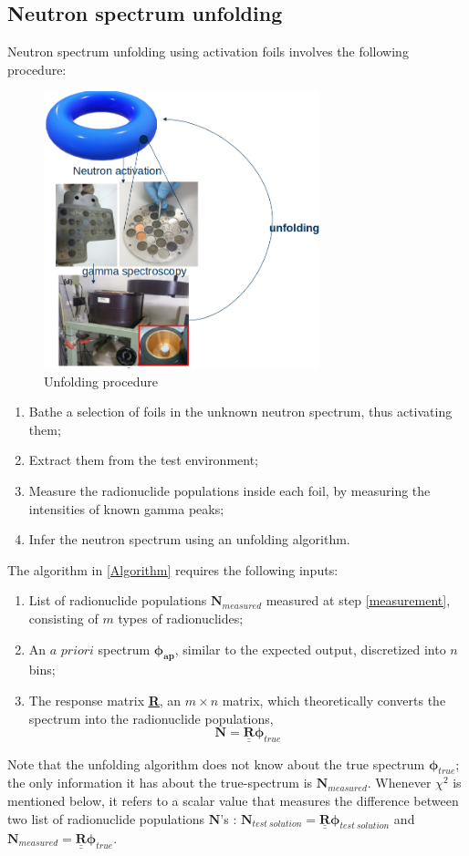 \documentclass[a4paper, 12pt]{article}
\newcommand{\matr}[1]{\underline{\underline{\textbf{#1}}}}
\newcommand{\ve}[1]{\boldsymbol{#1}}
\newcommand{\apriori}{\textit{a priori}}
\begin{document}
\begin{appendices}
\section{Neutron spectrum unfolding}\label{Prologue}
Neutron spectrum unfolding using activation foils involves the following procedure:
\begin{figure}[H]
\centering
\includegraphics[width=8cm]{00_diagram.png}
\caption{Unfolding procedure}
\end{figure}
\begin{enumerate}
    \item Bathe a selection of foils in the unknown neutron spectrum, thus activating them;
    \item Extract them from the test environment;
    \item Measure the radionuclide populations inside each foil, by measuring the intensities of known gamma peaks;\label{measurement}
    \item Infer the neutron spectrum using an unfolding algorithm.\label{Algorithm}
\end{enumerate}

The algorithm in \ref{Algorithm} requires the following inputs:
\begin{enumerate}
    \item List of radionuclide populations $\ve{N}_{measured}$ measured at step \ref{measurement}, consisting of $m$ types of radionuclides;
    \item An $\apriori$ spectrum $\ve{\phi_{ap}}$, similar to the expected output, discretized into $n$ bins;
    \item The response matrix \matr{R}, an $m \times n$ matrix, which theoretically converts the spectrum into the radionuclide populations, $$\ve{N}=\matr{R}\ve{\phi}_{true}$$
\end{enumerate}
Note that the unfolding algorithm does not know about the true spectrum $\ve{\phi}_{true}$; the only information it has about the true-spectrum is $\ve{N}_{measured}$.
Whenever $\chi^2$ is mentioned below, it refers to a scalar value that measures the difference between two list of radionuclide populations $\ve{N}$'s : $\ve{N}_{test\:solution} = \matr{R} \ve{\phi}_{test\:solution}$ and $\ve{N}_{measured} = \matr{R}\ve{\phi}_{true}$.
\end{appendices}
\end{document}
